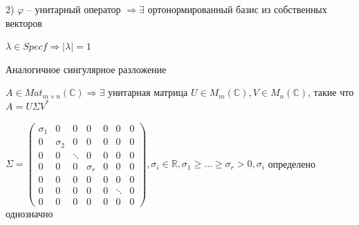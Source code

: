 2) $\varphi$ -- унитарный оператор $\Rightarrow \exists$ ортонормированный базис из собственных векторов

$\lambda \in Spec f \Rightarrow |\lambda| = 1$

\vspace{\baselineskip}
Аналогичное сингулярное разложение

\vspace{\baselineskip}
$A \in Mat_{m \times n} (\mathbb{C}) \Rightarrow \exists$ унитарная матрица $U \in M_m(\mathbb{C}), V \in M_n (\mathbb{C})$, такие что $A = U \Sigma V^*$

$\Sigma = \begin{pmatrix} \sigma_1 & 0 & 0 & 0 & 0 & 0 & 0 \\  0 & \sigma_2 & 0 & 0 & 0 & 0 & 0 \\ 0 & 0 & \ddots & 0 & 0 & 0 & 0 \\ 0 & 0 & 0 & \sigma_r & 0 & 0 & 0 \\ 0 & 0 & 0 & 0 & 0 & 0 & 0 \\ 0 & 0 & 0 & 0 & 0 & \ddots & 0 \\ 0 & 0 & 0 & 0 & 0 & 0 & 0 \end{pmatrix}, \sigma_i \in \mathbb{R}, \sigma_1 \geqslant \dots \geqslant \sigma_r > 0, \sigma_i$ определено однозначно 























